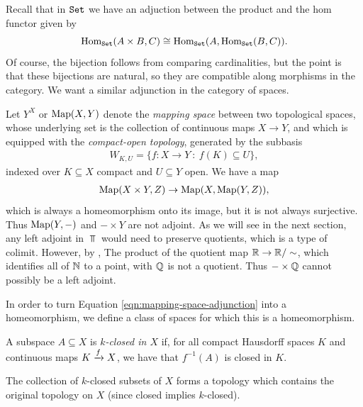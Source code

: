 \documentclass{article}[11pt]
\begin{document}
Recall that in $\texttt{Set}$ we have an adjuction between the product and the hom functor given by 
$$\textup{Hom}_{\texttt{Set}}(A\times B, C)\cong \textup{Hom}_{\texttt{Set}} (A, \textup{Hom}_{\texttt{Set}}(B,C)).$$ Of course, the bijection follows from comparing cardinalities, but the point is that these bijections are natural, so they are compatible along morphisms in the category. We want a similar adjunction in the category of spaces. 

Let $Y^X$ or $\textup{Map}(X,Y)$ denote the \textit{mapping space} between two topological spaces, whose underlying set is the collection of continuous maps $X\to Y$, and which is equipped with the \textit{compact-open topology}, generated by the subbasis
\begin{align*}
	W_{K,U} = \{ f: X \to Y \ : \ f(K)\subseteq U\},
\end{align*}
indexed over $K\subseteq X$ compact and $U\subseteq Y$ open. We have a map
\begin{align}\label{eqn:mapping-space-adjunction}
	\textup{Map}(X\times Y, Z) \to \textup{Map} (X, \textup{Map}(Y,Z)),
\end{align}
which is always a homeomorphism onto its image, but it is not always surjective. Thus $\textup{Map}(Y,-)$ and $-\times Y$ are not adjoint. As we will see in the next section, any left adjoint in $\Top$ would need to preserve quotients, which is a type of colimit. However, by \cite[Section 22, Example 7]{munkres}, The product of the quotient map  $\mathbb{R}\to \mathbb{R}/\sim$, which identifies all of $\mathbb{N}$ to a point, with $\mathbb{Q}$ is not a quotient. Thus $- \times \mathbb{Q}$ cannot possibly be a left adjoint.

In order to turn Equation \ref{eqn:mapping-space-adjunction} into a homeomorphism,
we define a class of spaces for which this is a homeomorphism. %

\begin{definition} A subspace $A\subseteq X$ is \textit{$k$-closed in $X$} if, for all compact Hausdorff spaces $K$ and continuous maps $K \xrightarrow{f} X$, we have that $f^{-1}(A)$ is closed in $K$.
\end{definition}

\begin{exercise} The collection of $k$-closed subsets of $X$ forms a topology which contains the original topology on $X$ (since closed implies $k$-closed).
\end{exercise}
\end{document}
